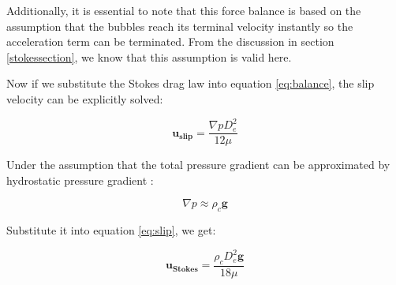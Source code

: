 Additionally, it is essential to note that this force balance is based on the assumption that the bubbles reach its terminal velocity instantly so the acceleration term can be terminated. From the discussion in section \ref{stokessection}, we know that this assumption is valid here.






Now if we substitute the Stokes drag law into equation \ref{eq:balance}, the slip velocity can be explicitly solved:

\begin{equation} \label{eq:slip}
    \mathbf{u_{slip}} = \frac{\nabla p D_e^2}{12\mu}
\end{equation}

Under the assumption that the total pressure gradient can be approximated by hydrostatic pressure gradient \cite{Sokolichin2004}:

\begin{equation}
    \nabla p \approx \rho_c \mathbf{g}
\end{equation}

Substitute it into equation \ref{eq:slip}, we get:

\begin{equation}\label{eq:stokes_slip}
    \mathbf{u_{Stokes}} = \frac{\rho_c D_e^2 \mathbf{g}}{18\mu}
\end{equation}

